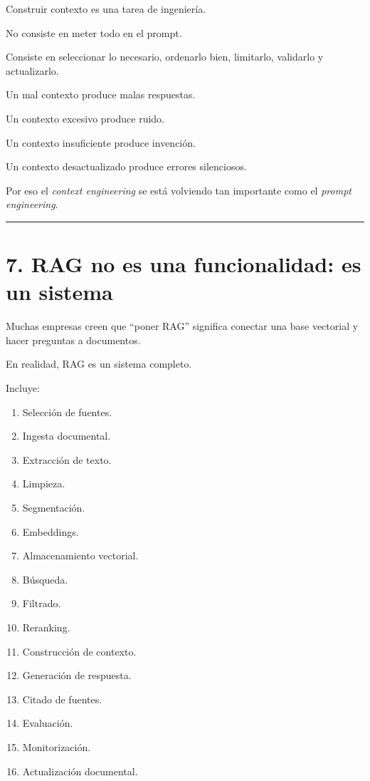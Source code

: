 Construir contexto es una tarea de ingeniería.

No consiste en meter todo en el prompt.

Consiste en seleccionar lo necesario, ordenarlo bien, limitarlo,
validarlo y actualizarlo.

Un mal contexto produce malas respuestas.

Un contexto excesivo produce ruido.

Un contexto insuficiente produce invención.

Un contexto desactualizado produce errores silenciosos.

Por eso el \emph{context engineering} se está volviendo tan importante
como el \emph{prompt engineering}.

\begin{center}\rule{0.5\linewidth}{0.5pt}\end{center}

\section{7. RAG no es una funcionalidad: es un
sistema}\label{rag-no-es-una-funcionalidad-es-un-sistema}

Muchas empresas creen que ``poner RAG'' significa conectar una base
vectorial y hacer preguntas a documentos.

En realidad, RAG es un sistema completo.

Incluye:

\begin{enumerate}
\def\labelenumi{\arabic{enumi}.}
\tightlist
\item
  Selección de fuentes.
\item
  Ingesta documental.
\item
  Extracción de texto.
\item
  Limpieza.
\item
  Segmentación.
\item
  Embeddings.
\item
  Almacenamiento vectorial.
\item
  Búsqueda.
\item
  Filtrado.
\item
  Reranking.
\item
  Construcción de contexto.
\item
  Generación de respuesta.
\item
  Citado de fuentes.
\item
  Evaluación.
\item
  Monitorización.
\item
  Actualización documental.
\end{enumerate}

